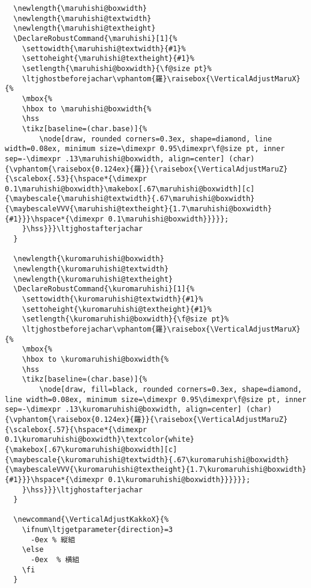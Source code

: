 \documentclass[luatex,fontsize=10pt,paper=b5,twoside]{jlreq}%
\begin{document}
\begin{lstlisting}
  \newlength{\maruhishi@boxwidth}
  \newlength{\maruhishi@textwidth}
  \newlength{\maruhishi@textheight}
  \DeclareRobustCommand{\maruhishi}[1]{%
    \settowidth{\maruhishi@textwidth}{#1}%
    \settoheight{\maruhishi@textheight}{#1}%
    \setlength{\maruhishi@boxwidth}{\f@size pt}%
    \ltjghostbeforejachar\vphantom{羅}\raisebox{\VerticalAdjustMaruX}{%
    \mbox{%
    \hbox to \maruhishi@boxwidth{%
    \hss
    \tikz[baseline=(char.base)]{%
        \node[draw, rounded corners=0.3ex, shape=diamond, line width=0.08ex, minimum size=\dimexpr 0.95\dimexpr\f@size pt, inner sep=-\dimexpr .13\maruhishi@boxwidth, align=center] (char) {\vphantom{\raisebox{0.124ex}{羅}}{\raisebox{\VerticalAdjustMaruZ}{\scalebox{.53}{\hspace*{\dimexpr 0.1\maruhishi@boxwidth}\makebox[.67\maruhishi@boxwidth][c]{\maybescale{\maruhishi@textwidth}{.67\maruhishi@boxwidth}{\maybescaleVVV{\maruhishi@textheight}{1.7\maruhishi@boxwidth}{#1}}}\hspace*{\dimexpr 0.1\maruhishi@boxwidth}}}}};
    }\hss}}}\ltjghostafterjachar
  }

  \newlength{\kuromaruhishi@boxwidth}
  \newlength{\kuromaruhishi@textwidth}
  \newlength{\kuromaruhishi@textheight}
  \DeclareRobustCommand{\kuromaruhishi}[1]{%
    \settowidth{\kuromaruhishi@textwidth}{#1}%
    \settoheight{\kuromaruhishi@textheight}{#1}%
    \setlength{\kuromaruhishi@boxwidth}{\f@size pt}%
    \ltjghostbeforejachar\vphantom{羅}\raisebox{\VerticalAdjustMaruX}{%
    \mbox{%
    \hbox to \kuromaruhishi@boxwidth{%
    \hss
    \tikz[baseline=(char.base)]{%
        \node[draw, fill=black, rounded corners=0.3ex, shape=diamond, line width=0.08ex, minimum size=\dimexpr 0.95\dimexpr\f@size pt, inner sep=-\dimexpr .13\kuromaruhishi@boxwidth, align=center] (char) {\vphantom{\raisebox{0.124ex}{羅}}{\raisebox{\VerticalAdjustMaruZ}{\scalebox{.57}{\hspace*{\dimexpr 0.1\kuromaruhishi@boxwidth}\textcolor{white}{\makebox[.67\kuromaruhishi@boxwidth][c]{\maybescale{\kuromaruhishi@textwidth}{.67\kuromaruhishi@boxwidth}{\maybescaleVVV{\kuromaruhishi@textheight}{1.7\kuromaruhishi@boxwidth}{#1}}}\hspace*{\dimexpr 0.1\kuromaruhishi@boxwidth}}}}}};
    }\hss}}}\ltjghostafterjachar
  }

  \newcommand{\VerticalAdjustKakkoX}{%
    \ifnum\ltjgetparameter{direction}=3
      -0ex % 縦組
    \else
      -0ex  % 横組
    \fi
  }


\end{lstlisting}
\end{document}
